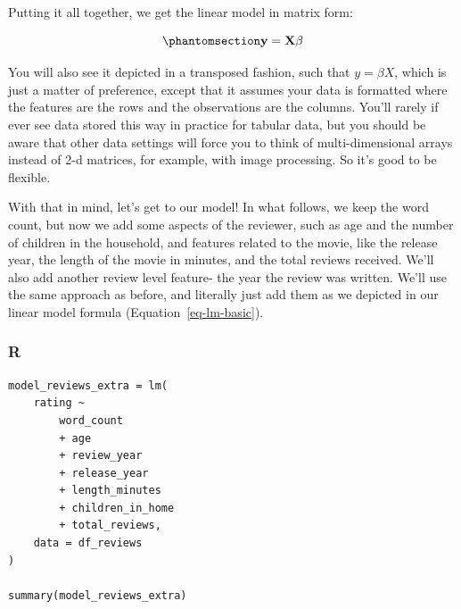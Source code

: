 \documentclass[
  letterpaper,
]{krantz}
\begin{document}
\begin{tcolorbox}[enhanced jigsaw, bottomrule=.15mm, rightrule=.15mm, colframe=quarto-callout-note-color-frame, colback=white, breakable, arc=.35mm, left=2mm, opacityback=0, leftrule=.75mm, toprule=.15mm]
Putting it all together, we get the linear model in matrix form:

\begin{equation}\phantomsection\label{eq-lm-mat-mult}{
\bf{y = X\beta }
}\end{equation}

You will also see it depicted in a transposed fashion, such that
\(y = \beta X\), which is just a matter of preference, except that it
assumes your data is formatted where the features are the rows and the
observations are the columns. You'll rarely if ever see data stored this
way in practice for tabular data, but you should be aware that other
data settings will force you to think of multi-dimensional
arrays\footnotemark{} instead of 2-d matrices, for example, with image
processing. So it's good to be flexible.

\end{tcolorbox}


With that in mind, let's get to our model! In what follows, we keep the
word count, but now we add some aspects of the reviewer, such as age and
the number of children in the household, and features related to the
movie, like the release year, the length of the movie in minutes, and
the total reviews received. We'll also add another review level feature-
the year the review was written. We'll use the same approach as before,
and literally just add them as we depicted in our linear model formula
(Equation~\ref{eq-lm-basic}).

\subsubsection{R}

\begin{verbatim}
model_reviews_extra = lm(
    rating ~
        word_count
        + age
        + review_year
        + release_year
        + length_minutes
        + children_in_home
        + total_reviews,
    data = df_reviews
)

summary(model_reviews_extra)
\end{verbatim}
\end{document}
